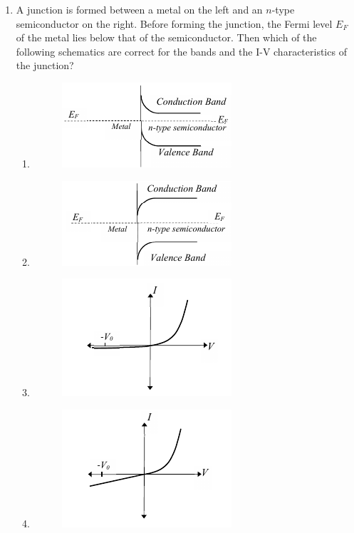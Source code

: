 \documentclass[journal,12pt,onecolumn]{IEEEtran}
\theoremstyle{remark}
\begin{document}
\begin{enumerate}
\item
A junction is formed between a metal on the left and an $n$-type semiconductor on the right. Before forming the junction, the Fermi level $E_F$ of the metal lies below that of the semiconductor. Then which of the following schematics are correct for the bands and the I-V characteristics of the junction?
\begin{enumerate}
    \item \begin{figure}[H] \caption*{} \label{fig:57a}\includegraphics{figs/57a.png}\end{figure}%
    \item \begin{figure}[H] \caption*{} \label{fig:57b}\includegraphics{figs/57b.png}\end{figure}%
    \item \begin{figure}[H] \caption*{} \label{fig:57c}\includegraphics{figs/57c.png}\end{figure}%
    \item \begin{figure}[H] \caption*{} \label{fig:57d}\includegraphics{figs/57d.png}\end{figure}%
\end{enumerate}



\end{enumerate}
\end{document}
